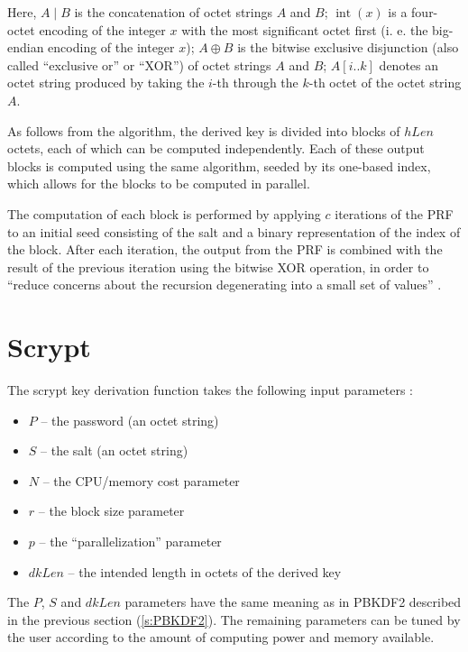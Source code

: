 \documentclass[12pt,oneside]{fithesis2}
\begin{document}
      Here, $A \mid B$ is the concatenation of octet strings $A$ and $B$; $\operatorname{int}(x)$ is a four-octet encoding of the integer $x$ with the most significant octet first (i. e. the big-endian encoding of the integer $x$); $A \oplus B$ is the bitwise exclusive disjunction (also called ``exclusive or'' or ``XOR'') of octet strings $A$ and $B$; $A[i..k]$ denotes an octet string produced by taking the $i$-th through the $k$-th octet of the octet string $A$.
      
      As follows from the algorithm, the derived key is divided into blocks of $hLen$ octets, each of which can be computed independently. Each of these output blocks is computed using the same algorithm, seeded by its one-based index, which allows for the blocks to be computed in parallel.
      
      The computation of each block is performed by applying $c$ iterations of the PRF to an initial seed consisting of the salt and a binary representation of the index of the block. After each iteration, the output from the PRF is combined with the result of the previous iteration using the bitwise XOR operation, in order to ``reduce concerns about the recursion degenerating into a small set of values'' \cite[section 5.2]{rfc2898}.
      
      \section{Scrypt}
      The scrypt key derivation function takes the following input parameters \cite[chapter 7]{scrypt}:
      \begin{itemize}
        \item $P$ -- the password (an octet string)
        \item $S$ -- the salt (an octet string)
        \item $N$ -- the CPU/memory cost parameter
        \item $r$ -- the block size parameter
        \item $p$ -- the ``parallelization'' parameter
        \item $dkLen$ -- the intended length in octets of the derived key
      \end{itemize}
      
      The $P$, $S$ and $dkLen$ parameters have the same meaning as in PBKDF2 described in the previous section (\ref{s:PBKDF2}). The remaining parameters can be tuned by the user according to the amount of computing power and memory available.
\end{document}
